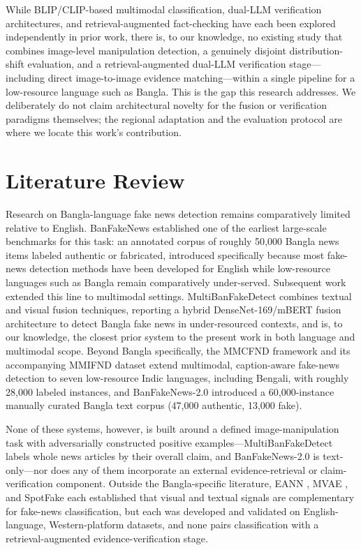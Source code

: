 \documentclass[conference,a4paper]{IEEEtran}
\begin{document}
While BLIP/CLIP-based multimodal classification, dual-LLM verification
architectures, and retrieval-augmented fact-checking have each been explored
independently in prior work, there is, to our knowledge, no existing study
that combines image-level manipulation detection, a genuinely disjoint
distribution-shift evaluation, and a retrieval-augmented dual-LLM
verification stage---including direct image-to-image evidence matching---within
a single pipeline for a low-resource language such as Bangla. This is the gap
this research addresses. We deliberately do not claim architectural novelty
for the fusion or verification paradigms themselves; the regional adaptation
and the evaluation protocol are where we locate this work's contribution.

\section{Literature Review}

Research on Bangla-language fake news detection remains comparatively limited
relative to English. BanFakeNews \cite{banfakenews} established one of the
earliest large-scale benchmarks for this task: an annotated corpus of roughly
50{,}000 Bangla news items labeled authentic or fabricated, introduced
specifically because most fake-news detection methods have been developed for
English while low-resource languages such as Bangla remain comparatively
under-served. Subsequent work extended this line to multimodal settings.
MultiBanFakeDetect \cite{multibanfake} combines textual and visual fusion
techniques, reporting a hybrid DenseNet-169/mBERT fusion architecture to
detect Bangla fake news in under-resourced contexts, and is, to our knowledge,
the closest prior system to the present work in both language and multimodal
scope. Beyond Bangla specifically, the MMCFND framework and its accompanying
MMIFND dataset \cite{mmcfnd} extend multimodal, caption-aware fake-news
detection to seven low-resource Indic languages, including Bengali, with
roughly 28{,}000 labeled instances, and BanFakeNews-2.0 \cite{banfakenews2}
introduced a 60{,}000-instance manually curated Bangla text corpus
(47{,}000 authentic, 13{,}000 fake).

None of these systems, however, is built around a defined image-manipulation
task with adversarially constructed positive examples---MultiBanFakeDetect
labels whole news articles by their overall claim, and BanFakeNews-2.0 is
text-only---nor does any of them incorporate an external evidence-retrieval or
claim-verification component. Outside the Bangla-specific literature, EANN
\cite{eann}, MVAE \cite{mvae}, and SpotFake \cite{spotfake} each established
that visual and textual signals are complementary for fake-news
classification, but each was developed and validated on English-language,
Western-platform datasets, and none pairs classification with a
retrieval-augmented evidence-verification stage.
\end{document}
